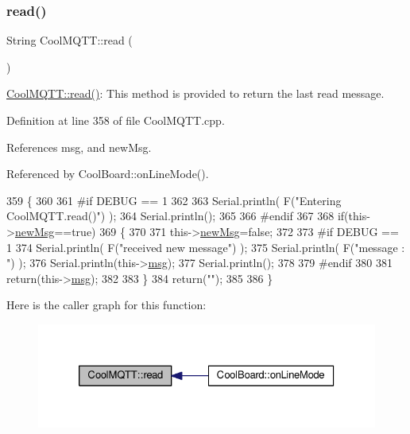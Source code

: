 \subsubsection{\texorpdfstring{read()}{read()}}
{\footnotesize\ttfamily String Cool\+M\+Q\+T\+T\+::read (\begin{DoxyParamCaption}{ }\end{DoxyParamCaption})}

\hyperlink{classCoolMQTT_ae3c18f6ae9723746d32765f1c8f176ca}{Cool\+M\+Q\+T\+T\+::read()}\+: This method is provided to return the last read message. 

Definition at line 358 of file Cool\+M\+Q\+T\+T.\+cpp.



References msg, and new\+Msg.



Referenced by Cool\+Board\+::on\+Line\+Mode().


\begin{DoxyCode}
359 \{   
360 
361 \textcolor{preprocessor}{#if DEBUG == 1 }
362 
363     Serial.println( F(\textcolor{stringliteral}{"Entering CoolMQTT.read()"}) );
364     Serial.println();
365 
366 \textcolor{preprocessor}{#endif }
367 
368     \textcolor{keywordflow}{if}(this->\hyperlink{classCoolMQTT_a3240388137b885775aadf38e96b24c6b}{newMsg}==\textcolor{keyword}{true})
369     \{
370         
371         this->\hyperlink{classCoolMQTT_a3240388137b885775aadf38e96b24c6b}{newMsg}=\textcolor{keyword}{false};
372 
373 \textcolor{preprocessor}{#if DEBUG == 1 }
374         Serial.println( F(\textcolor{stringliteral}{"received new message"}) );
375         Serial.println( F(\textcolor{stringliteral}{"message : "}) );
376         Serial.println(this->\hyperlink{classCoolMQTT_af6b19e7074dbbb4ae493c44dcb53f7ff}{msg});
377         Serial.println();
378 
379 \textcolor{preprocessor}{#endif}
380 
381         \textcolor{keywordflow}{return}(this->\hyperlink{classCoolMQTT_af6b19e7074dbbb4ae493c44dcb53f7ff}{msg});
382         
383     \}
384     \textcolor{keywordflow}{return}(\textcolor{stringliteral}{""});
385 
386 \}
\end{DoxyCode}
Here is the caller graph for this function\+:
\nopagebreak
\begin{figure}[H]
\begin{center}
\leavevmode
\includegraphics[width=326pt]{classCoolMQTT_ae3c18f6ae9723746d32765f1c8f176ca_icgraph}
\end{center}
\end{figure}
\mbox{\label{classCoolMQTT_a5d003307eff78efbd585e42b43b72b6d}} 
